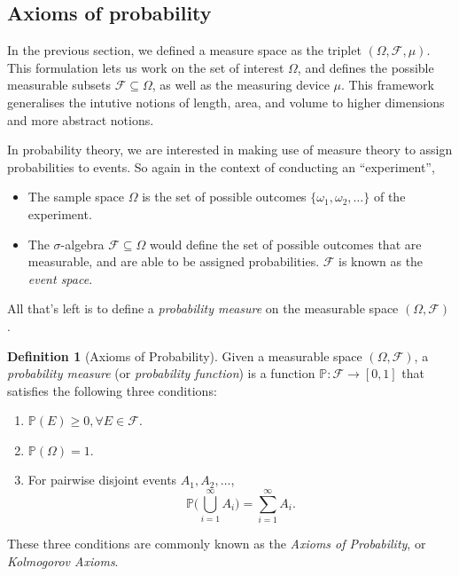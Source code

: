\documentclass[
]{book}
\providecommand{\tightlist}{%
  \setlength{\itemsep}{0pt}\setlength{\parskip}{0pt}}
\newcommand{\bbP}{\mathbb{P}}
\newcommand{\cF}{{\mathcal F}}
\theoremstyle{definition}
\newtheorem{definition}{Definition}[chapter]
\theoremstyle{definition}
\theoremstyle{definition}
\theoremstyle{definition}
\theoremstyle{remark}
\begin{document}
\hypertarget{axioms-of-probability}{%
\subsection{Axioms of probability}\label{axioms-of-probability}}

In the previous section, we defined a measure space as the triplet \((\Omega,\cF,\mu)\).
This formulation lets us work on the set of interest \(\Omega\), and defines the possible measurable subsets \(\cF\subseteq \Omega\), as well as the measuring device \(\mu\).
This framework generalises the intutive notions of length, area, and volume to higher dimensions and more abstract notions.

In probability theory, we are interested in making use of measure theory to assign probabilities to events. So again in the context of conducting an ``experiment'',

\begin{itemize}
\tightlist
\item
  The sample space \(\Omega\) is the set of possible outcomes \(\{\omega_1,\omega_2,\dots\}\) of the experiment.
\item
  The \(\sigma\)-algebra \(\cF\subseteq\Omega\) would define the set of possible outcomes that are measurable, and are able to be assigned probabilities. \(\cF\) is known as the \emph{event space}.
\end{itemize}

All that's left is to define a \emph{probability measure} on the measurable space \((\Omega,\cF)\).

\begin{definition}[Axioms of Probability]
Given a measurable space \((\Omega,\cF)\), a \emph{probability measure} (or \emph{probability function}) is a function \(\bbP:\cF\to[0,1]\) that satisfies the following three conditions:

\begin{enumerate}
\def\labelenumi{\roman{enumi}.}
\tightlist
\item
  \(\bbP(E) \geq 0, \forall E \in \cF\).
\item
  \(\bbP(\Omega) = 1\).
\item
  For pairwise disjoint events \(A_1,A_2,\dots\), \[\bbP\bigg( \bigcup_{i=1}^\infty A_i  \bigg) = \sum_{i=1}^\infty A_i.\]
\end{enumerate}

These three conditions are commonly known as the \emph{Axioms of Probability}, or \emph{Kolmogorov Axioms}.
\end{definition}
\end{document}
